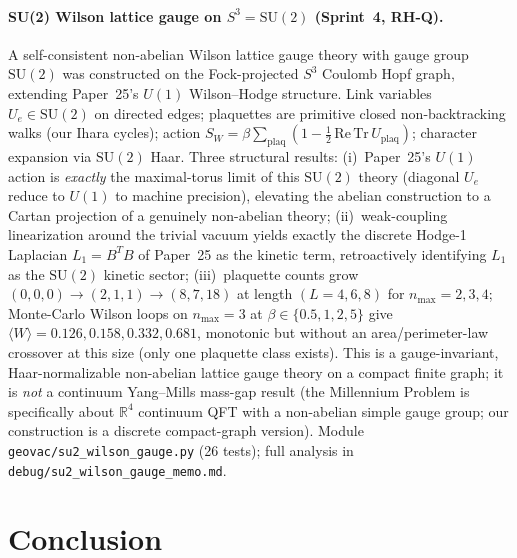\documentclass[11pt]{article}
\begin{document}
\paragraph{SU(2) Wilson lattice gauge on $S^3 = \mathrm{SU}(2)$
(Sprint~4, RH-Q).}  A self-consistent non-abelian Wilson lattice
gauge theory with gauge group $\mathrm{SU}(2)$ was constructed on
the Fock-projected $S^3$ Coulomb Hopf graph, extending Paper~25's
$U(1)$ Wilson--Hodge structure.  Link variables $U_e \in
\mathrm{SU}(2)$ on directed edges; plaquettes are primitive
closed non-backtracking walks (our Ihara cycles); action
$S_W = \beta \sum_{\mathrm{plaq}} (1 - \tfrac{1}{2}\,\mathrm{Re}\,
\mathrm{Tr}\,U_{\mathrm{plaq}})$; character expansion via
$\mathrm{SU}(2)$ Haar.  Three structural results: (i)~Paper~25's
$U(1)$ action is \emph{exactly} the maximal-torus limit of this
$\mathrm{SU}(2)$ theory (diagonal $U_e$ reduce to $U(1)$ to machine
precision), elevating the abelian construction to a Cartan
projection of a genuinely non-abelian theory; (ii)~weak-coupling
linearization around the trivial vacuum yields exactly the
discrete Hodge-1 Laplacian $L_1 = B^T B$ of Paper~25 as the
kinetic term, retroactively identifying $L_1$ as the
$\mathrm{SU}(2)$ kinetic sector; (iii)~plaquette counts grow
$(0, 0, 0) \to (2, 1, 1) \to (8, 7, 18)$ at length $(L=4, 6, 8)$
for $n_{\max} = 2, 3, 4$; Monte-Carlo Wilson loops on $n_{\max}=3$
at $\beta \in \{0.5, 1, 2, 5\}$ give
$\langle W \rangle = 0.126, 0.158, 0.332, 0.681$, monotonic but
without an area/perimeter-law crossover at this size (only one
plaquette class exists).  This is a gauge-invariant, Haar-normalizable
non-abelian lattice gauge theory on a compact finite graph; it is
\emph{not} a continuum Yang--Mills mass-gap result (the Millennium
Problem is specifically about $\mathbb{R}^4$ continuum QFT with
a non-abelian simple gauge group; our construction is a discrete
compact-graph version).  Module
\texttt{geovac/su2\_wilson\_gauge.py} (26 tests);
full analysis in \texttt{debug/su2\_wilson\_gauge\_memo.md}.

\section{Conclusion}
\label{sec:conclusion}
\end{document}
